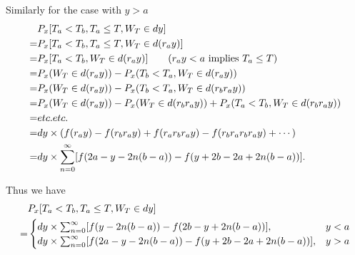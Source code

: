 Similarly for the case with $y>a$
\begin{align*}
	&P_x[T_a<T_b, T_a\le T, W_T\in dy]  \notag \\
	=& P_x[T_a<T_b, T_a\le T, W_T\in d(r_a y)]  \notag \\
	=& P_x[T_a<T_b, W_T\in d(r_a y)]  \qquad \text{($r_a y<a$ implies $T_a\le T$)} 
	   \notag \\
  =& P_x(W_T\in d(r_a y)) - P_x(T_b<T_a, W_T\in d(r_a y)) \notag \\
  =& P_x(W_T\in d(r_a y)) - P_x(T_b<T_a, W_T\in d(r_b r_a y)) \notag \\
  =& P_x(W_T\in d(r_a y)) - P_x(W_T\in d(r_b r_a y)) 
	   + P_x(T_a<T_b, W_T\in d(r_b r_a y)) \notag \\
	=& etc.etc. \notag \\
  =& dy\times (f(r_a y) - f(r_b r_a y) + f(r_a r_b r_a y) - f(r_b r_a r_b r_a y)
		 + \cdots) \\
  =& dy\times\sum_{n=0}^{\infty} [ f(2a-y-2n(b-a)) - f(y+2b-2a + 2n(b-a)) ].
\end{align*}

Thus we have
\begin{align}
	 & P_x[T_a<T_b, T_a\le T, W_T\in dy]  \notag \\
	=& \begin{cases}
     	 dy\times\sum_{n=0}^{\infty} [ f(y-2n(b-a)) - f(2b-y+2n(b-a)) ],         & y<a \\
	     dy\times\sum_{n=0}^{\infty} [ f(2a-y-2n(b-a)) - f(y+2b-2a + 2n(b-a)) ], & y>a
     \end{cases}
\end{align}

